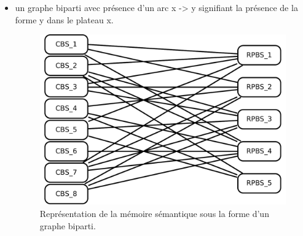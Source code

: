 \begin{itemize}
\item un graphe biparti avec présence d'un arc x -> y signifiant la présence de la forme y dans le plateau x.
\begin{figure}[H]
\includegraphics[width=\textwidth]{files/memoire/context_graph}
\caption{Représentation de la mémoire sémantique sous la forme d'un graphe biparti.}
\end{figure}
\end{itemize}